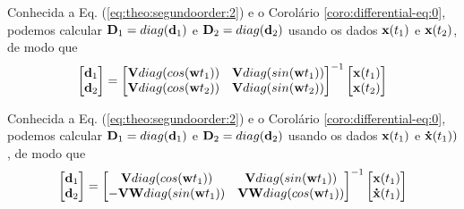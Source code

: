 \begin{corollary}
\label{coro:differential-eq:1}
Conhecida a Eq. (\ref{eq:theo:segundoorder:2}) e o Corolário \ref{coro:differential-eq:0},
podemos calcular
$\MATRIX{D}_1=\funcdiag(\VECTOR{d}_1)$ e $\MATRIX{D}_2=\funcdiag(\VECTOR{d}_2)$ 
usando os dados $\VECTOR{x}(t_1)$ e $\VECTOR{x}(t_2)$, de modo que
\begin{equation}\label{eq:coro:differential-eq:1:a}
\begin{bmatrix}
\VECTOR{d}_1\\
\VECTOR{d}_2
\end{bmatrix}
=
\begin{bmatrix}
\MATRIX{V} \funcdiag(cos(\VECTOR{w}t_1)) &  \MATRIX{V} \funcdiag(sin(\VECTOR{w}t_1))\\
\MATRIX{V} \funcdiag(cos(\VECTOR{w}t_2)) &  \MATRIX{V} \funcdiag(sin(\VECTOR{w}t_2))
\end{bmatrix}^{-1}
\begin{bmatrix}
\VECTOR{x}(t_1)\\
\VECTOR{x}(t_2)
\end{bmatrix}
\end{equation}
\end{corollary}

\begin{corollary}
\label{coro:differential-eq:2}
Conhecida a Eq. (\ref{eq:theo:segundoorder:2}) e o Corolário \ref{coro:differential-eq:0},
podemos calcular
$\MATRIX{D}_1=\funcdiag(\VECTOR{d}_1)$ e $\MATRIX{D}_2=\funcdiag(\VECTOR{d}_2)$ 
usando os dados $\VECTOR{x}(t_1)$ e $\VECTOR{\dot{x}}(t_1))$, de modo que
\begin{equation}\label{eq:coro:differential-eq:2:1}
\begin{bmatrix}
\VECTOR{d}_1\\
\VECTOR{d}_2
\end{bmatrix}
=
\begin{bmatrix}
\MATRIX{V} \funcdiag(cos(\VECTOR{w}t_1)) &  \MATRIX{V} \funcdiag(sin(\VECTOR{w}t_1))\\
-\MATRIX{V}\MATRIX{W} \funcdiag(sin(\VECTOR{w}t_1)) &  \MATRIX{V}\MATRIX{W}\funcdiag(cos(\VECTOR{w}t_1))
\end{bmatrix}^{-1}
\begin{bmatrix}
\VECTOR{x}(t_1)\\
\VECTOR{\dot{x}}(t_1)
\end{bmatrix}
\end{equation}
\end{corollary}

